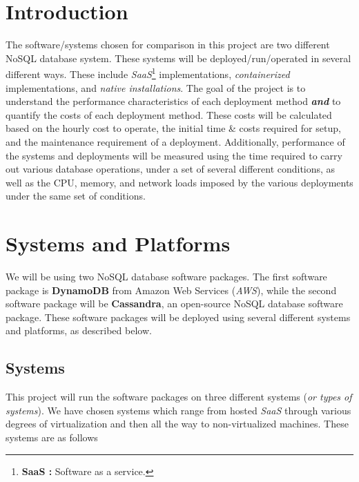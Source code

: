 \section{Introduction}

The software/systems chosen for comparison in this project are two different NoSQL database system.  These systems will be deployed/run/operated in several different ways.  These include \emph{SaaS}\footnote{\textbf{SaaS :} Software as a service.} implementations, \emph{containerized} implementations, and \emph{native installations}.  The goal of the project is to understand the performance characteristics of each deployment method \emph{\textbf{and}} to quantify the costs of each deployment method.  These costs will be calculated based on the hourly cost to operate, the initial time \& costs required for setup, and the maintenance requirement of a deployment.  Additionally, performance of the systems and deployments will be measured using the time required to carry out various database operations, under a set of several different conditions, as well as the CPU, memory, and network loads imposed by the various deployments under the same set of conditions.







\section{Systems and Platforms}
We will be using two NoSQL database software packages.  The first software package is \textbf{DynamoDB} from Amazon Web Services (\emph{AWS}), while the second software package will be \textbf{Cassandra}, an open-source NoSQL database software package.  These software packages will be deployed using several different systems and platforms, as described below.



\subsection{Systems}

This project will run the software packages on three different systems (\emph{or types of systems}).  We have chosen systems which range from hosted \emph{SaaS} through various degrees of virtualization and then all the way to non-virtualized machines.  These systems are as follows

